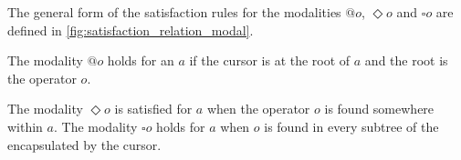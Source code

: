 \documentclass[sigplan,screen]{acmart}
\begin{document}

The general form of the satisfaction rules for the modalities $@o$,
$\Diamond o$ and $\square o$ are defined in
\cref{fig:satisfaction_relation_modal}.

The modality $@o$ holds for an \abt $a$ if the cursor is at the root of
$a$ and the root is the operator $o$.

The modality $\Diamond o$ is satisfied for $a$ when the operator $o$ is
found somewhere within $a$. The modality
$\square o$ holds for $a$ when $o$ is found in every subtree of the
\abt encapsulated by the cursor. 
\end{document}
